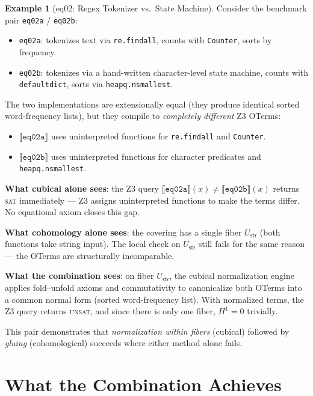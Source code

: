 \documentclass[11pt,a4paper]{report}
\theoremstyle{definition}
\newtheorem{example}[definition]{Example}
\theoremstyle{plain}
\newcommand{\den}[1]{\llbracket #1 \rrbracket}
\newcommand{\Hone}{H^1}
\begin{document}
\begin{example}[eq02: Regex Tokenizer vs.\ State Machine]
\label{ex:eq02}
Consider the benchmark pair \texttt{eq02a} / \texttt{eq02b}:
\begin{itemize}
  \item \texttt{eq02a}: tokenizes text via \texttt{re.findall},
    counts with \texttt{Counter}, sorts by frequency.
  \item \texttt{eq02b}: tokenizes via a hand-written character-level
    state machine, counts with \texttt{defaultdict}, sorts via
    \texttt{heapq.nsmallest}.
\end{itemize}

The two implementations are extensionally equal (they produce
identical sorted word-frequency lists), but they compile to
\emph{completely different} Z3 OTerms:
\begin{itemize}
  \item $\den{\mathtt{eq02a}}$ uses uninterpreted functions for
    \texttt{re.findall} and \texttt{Counter}.
  \item $\den{\mathtt{eq02b}}$ uses uninterpreted functions for
    character predicates and \texttt{heapq.nsmallest}.
\end{itemize}

\textbf{What cubical alone sees}: the Z3 query
$\den{\mathtt{eq02a}}(x) \neq \den{\mathtt{eq02b}}(x)$ returns
\textsc{sat} immediately --- Z3 assigns uninterpreted functions to
make the terms differ.  No equational axiom closes this gap.

\textbf{What cohomology alone sees}: the covering has a single
fiber $U_{\mathsf{str}}$ (both functions take string input).  The
local check on $U_{\mathsf{str}}$ still fails for the same reason
--- the OTerms are structurally incomparable.

\textbf{What the combination sees}: on fiber $U_{\mathsf{str}}$,
the cubical normalization engine applies fold--unfold axioms and
commutativity to canonicalize both OTerms into a common normal form
(sorted word-frequency list).  With normalized terms, the Z3 query
returns \textsc{unsat}, and since there is only one fiber,
$\Hone = 0$ trivially.

This pair demonstrates that \emph{normalization within fibers}
(cubical) followed by \emph{gluing} (cohomological) succeeds
where either method alone fails.
\end{example}

\section{What the Combination Achieves}
\end{document}
